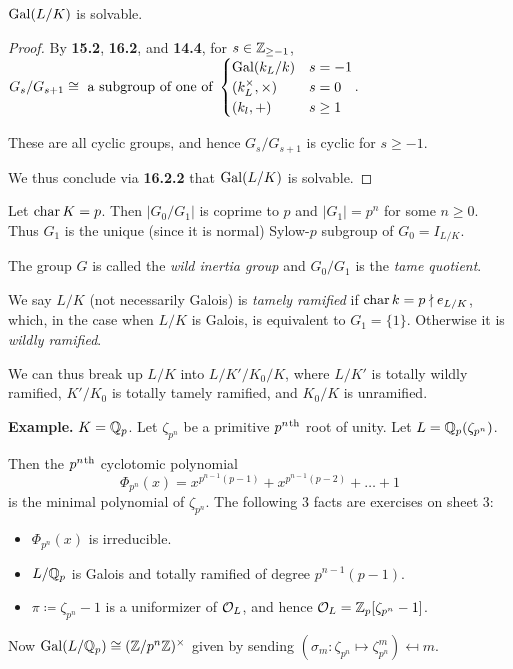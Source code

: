 \documentclass[10pt,a4paper]{article}
\begin{document}
\begin{corollary}
  $\operatorname{Gal}(L/K)$ is solvable.
\end{corollary}
\begin{proof}
  By \textbf{15.2}, \textbf{16.2}, and \textbf{14.4}, for $s \in \mathbb{Z}_{\geq -1}$, $G_s/G_{s+1}\cong \text{ a subgroup of one of }\begin{cases} \operatorname{Gal}(k_L/k) & s = -1 \\ (k_L^\times, \times) & s = 0\\ (k_l, +) & s \geq 1\end{cases}$.

  These are all cyclic groups, and hence $G_s/G_{s+1}$ is cyclic for $s \geq -1$.

  We thus conclude via \textbf{16.2.2} that $\operatorname{Gal}(L/K)$ is solvable.
\end{proof}
Let $\operatorname{char} K = p$. Then $|G_0/G_1|$ is coprime to $p$ and $|G_1| = p^n$ for some $n \geq 0$. Thus $G_1$ is the unique (since it is normal) Sylow-$p$ subgroup of $G_0 = I_{L/K}$.
\begin{definition}
  The group $G$ is called the \emph{wild inertia group} and $G_0/G_1$ is the \emph{tame quotient}.

  We say $L/K$ (not necessarily Galois) is \emph{tamely ramified} if $\operatorname{char} k = p \nmid e_{L/K}$, which, in the case when $L/K$ is Galois, is equivalent to $G_1 = \{1\}$. Otherwise it is \emph{wildly ramified}.
\end{definition}
We can thus break up $L/K$ into $L/K'/K_0/K$, where $L/K'$ is totally wildly ramified, $K'/K_0$ is totally tamely ramified, and $K_0/K$ is unramified.

\textbf{Example.} $K = \mathbb{Q}_p$. Let $\zeta_{p^n}$ be a primitive $p^n\textsuperscript{th}$ root of unity. Let $L = \mathbb{Q}_p(\zeta_{p^n})$.

Then the $p^n\textsuperscript{th}$ cyclotomic polynomial
\[\Phi_{p^n}(x) = x^{p^{n-1}(p-1)}+x^{p^{n-1}(p-2)}+\ldots+1\]
is the minimal polynomial of $\zeta_{p^n}$. The following 3 facts are exercises on sheet 3:
\begin{itemize}
  \item $\Phi_{p^n}(x)$ is irreducible.
  \item $L/\mathbb{Q}_p$ is Galois and totally ramified of degree $p^{n-1}(p-1)$.
  \item $\pi \coloneqq \zeta_{p^n}-1$ is a uniformizer of $\mathcal{O}_L$, and hence $\mathcal{O}_L = \mathbb{Z}_p[\zeta_{p^n}-1]$.
\end{itemize}
Now $\operatorname{Gal}(L/\mathbb{Q}_p) \cong (\mathbb{Z}/p^n\mathbb{Z})^\times$ given by sending $(\sigma_m:\zeta_{p^n}\mapsto \zeta_{p^n}^m)\mapsfrom m$.
\end{document}
